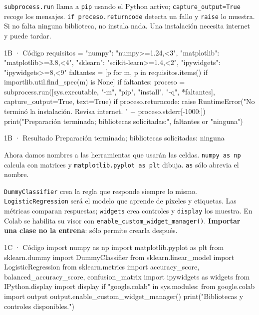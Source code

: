 \texttt{\small subprocess.\allowbreak{}run} llama a \texttt{\small pip} usando el Python activo; \texttt{\small capture\_\allowbreak{}output=\allowbreak{}True} recoge los mensajes. \texttt{\small if proceso.\allowbreak{}returncode} detecta un fallo y \texttt{\small raise} lo muestra. Si no falta ninguna biblioteca, no instala nada. Una instalación necesita internet y puede tardar.


\begin{Codigo}{1B · Código}
requisitos = {"numpy": "numpy>=1.24,<3", "matplotlib": "matplotlib>=3.8,<4", "sklearn": "scikit-learn>=1.4,<2", "ipywidgets": "ipywidgets>=8,<9"}
faltantes = [p for m, p in requisitos.items() if importlib.util.find_spec(m) is None]
if faltantes:
    proceso = subprocess.run([sys.executable, "-m", "pip", "install", "-q", *faltantes], capture_output=True, text=True)
    if proceso.returncode:
        raise RuntimeError("No terminó la instalación. Revisa internet. " + proceso.stderr[-1000:])
print("Preparación terminada; bibliotecas solicitadas:", faltantes or "ninguna")
\end{Codigo}

\begin{Salida}{1B · Resultado}
Preparación terminada; bibliotecas solicitadas: ninguna
\end{Salida}

\label{paso-1c}

Ahora damos nombres a las herramientas que usarán las celdas. \texttt{\small numpy as np} calcula con matrices y \texttt{\small matplotlib.\allowbreak{}pyplot as plt} dibuja. \texttt{\small as} sólo abrevia el nombre.

\texttt{\small DummyClassifier} crea la regla que responde siempre lo mismo. \texttt{\small LogisticRegression} será el modelo que aprende de píxeles y etiquetas. Las métricas comparan respuestas; \texttt{\small widgets} crea controles y \texttt{\small display} los muestra. En Colab se habilita su visor con \texttt{\small enable\_\allowbreak{}custom\_\allowbreak{}widget\_\allowbreak{}manager(\allowbreak{})\allowbreak{}}. \textbf{Importar una clase no la entrena}: sólo permite crearla después.


\begin{Codigo}{1C · Código}
import numpy as np
import matplotlib.pyplot as plt
from sklearn.dummy import DummyClassifier
from sklearn.linear_model import LogisticRegression
from sklearn.metrics import accuracy_score, balanced_accuracy_score, confusion_matrix
import ipywidgets as widgets
from IPython.display import display
if "google.colab" in sys.modules:
    from google.colab import output
    output.enable_custom_widget_manager()
print("Bibliotecas y controles disponibles.")
\end{Codigo}

